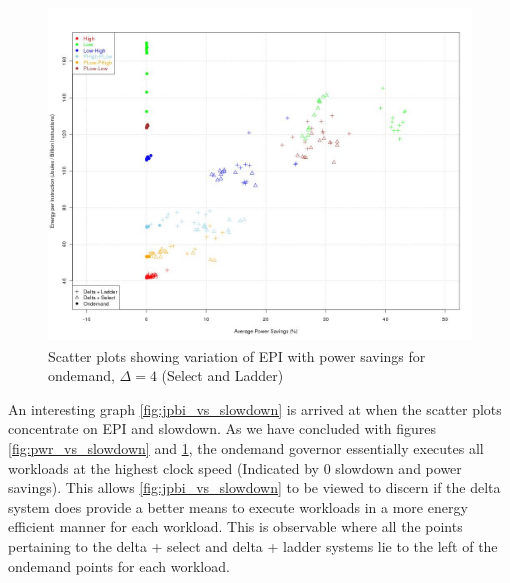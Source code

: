 \begin{figure}[h!]
  \begin{center}
    \includegraphics[height=3.5in]{figures/pwr_vs_jpbi_delta_4.jpg}%
    \caption{Scatter plots showing variation of EPI with power savings for ondemand, $\Delta=4$ (Select and Ladder)}
    \label{fig:pwr_vs_jpbi}
  \end{center}
\end{figure}


An interesting graph \ref{fig:jpbi_vs_slowdown} is arrived at when the scatter plots concentrate on
EPI and slowdown. As we have concluded with figures \ref{fig:pwr_vs_slowdown} and \ref{fig:pwr_vs_jpbi},
the ondemand governor essentially executes all workloads at the highest clock speed (Indicated by 0 slowdown 
and power savings). This allows \ref{fig:jpbi_vs_slowdown} to be viewed to discern if the delta system
does provide a better means to execute workloads in a more energy efficient manner for each workload. This is observable
where all the points pertaining to the delta + select and delta + ladder systems lie to the left of 
the ondemand points for each workload.

